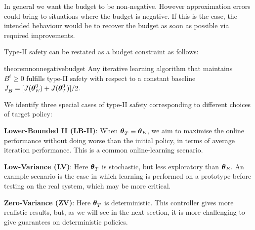\begin{note}
In general we want the budget to be non-negative. However approximation errors could bring to situations where the budget is negative. If this is the case, the intended behaviour would be to recover the budget as soon as possible via required improvements.
\end{note}

Type-II safety can be restated as a budget constraint as follows:
\begin{restatable}{theorem}{nonnegativebudget}\label{th:nonnegativebudget}
Any iterative learning algorithm that maintains $B^t \geq 0$ fulfills type-II safety with respect to a constant baseline $\jbase[] = [J(\vtheta_E^0) + J(\vtarget[0])] / 2$.
\end{restatable}
%
We identify three special cases of type-II safety corresponding to different choices of target policy:

\textbf{Lower-Bounded II (LB-II)}: When $\vtarget[] \equiv \vtheta_E$, we aim to maximise the online performance without doing worse than the initial policy, in terms of average iteration performance. This is a common online-learning scenario.

\textbf{Low-Variance (LV)}:  Here $\vtarget[]$ is stochastic, but less exploratory than $\vtheta_E$. An example scenario is the case in which learning is performed on a prototype before testing on the real system, which may be more critical. 

\textbf{Zero-Variance (ZV)}: Here $\vtarget[]$ is deterministic. This controller gives more realistic results, but, as we will see in the next section, it is more challenging to give guarantees on deterministic policies.  

